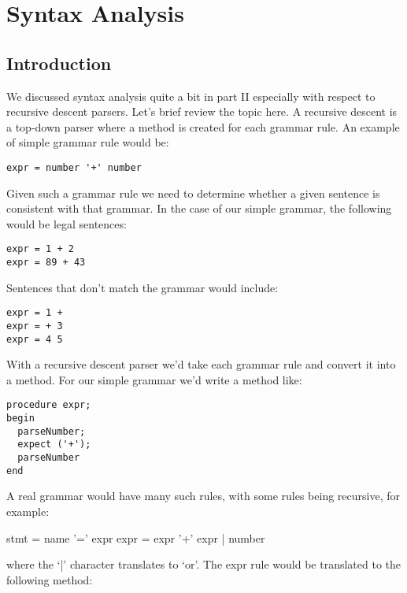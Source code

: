 {\bfseries\slshape\sffamily\color{ChapterTitleColor} \chapter{Syntax Analysis}} \label{chap:syntaxanalysis}

\section{Introduction}

We discussed syntax analysis quite a bit in part II especially with respect to recursive descent parsers. Let's brief review the topic here. A recursive descent is a top-down parser where a method is created for each grammar rule. An example of simple grammar rule would be:

\begin{lstlisting}
expr = number '+' number
\end{lstlisting}

Given such a grammar rule we need to determine whether a given sentence is consistent with that grammar. In the case of our simple grammar, the following would be legal sentences:

\begin{lstlisting}
expr = 1 + 2
expr = 89 + 43
\end{lstlisting}

Sentences that don't match the grammar would include:

\begin{lstlisting}
expr = 1 +
expr = + 3
expr = 4 5
\end{lstlisting}

With a recursive descent parser we'd take each grammar rule and convert it into a method. For our simple grammar we'd write a method like:

\begin{lstlisting}
procedure expr;
begin
  parseNumber;
  expect ('+');
  parseNumber
end
\end{lstlisting}

A real grammar would have many such rules, with some rules being recursive, for example:

\begin{lcverbatim}
stmt =   name '=' expr
expr =   expr '+' expr
       | number
\end{lcverbatim}

where the `|' character translates to `or'. The expr rule would be translated to the following method:

